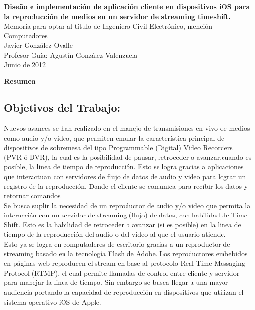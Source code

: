 \newpage
\thispagestyle{empty}
\begin{center}
 \Large \textbf{Diseño e implementación de aplicación cliente en dispositivos iOS para la reproducción de medios en un servidor de streaming timeshift.}\\

\normalsize Memoria para optar al título de Ingeniero Civil Electrónico, mención Computadores \\
\normalsize Javier González Ovalle \\
\normalsize Profesor Guía: Agustín González Valenzuela \\
\normalsize Junio de 2012

\Large \textbf{Resumen}

\end{center}
\normalsize
\subsection*{Objetivos del Trabajo:}
\normalsize

Nuevos avances se han realizado en el manejo de transmisiones en vivo de medios como audio y/o video, que permiten emular la característica principal de dispositivos de sobremesa del tipo Programmable (Digital) Video Recorders (PVR ó DVR), la cual es la posibilidad de pausar, retroceder o avanzar,cuando es posible, la linea de tiempo de reproducción. Esto se logra gracias a aplicaciones que interactuan con servidores de flujo de datos de audio y video para lograr un registro de la reproducción. Donde el cliente se comunica para recibir los datos y retornar comandos\\ 

Se busca suplir la necesidad de un reproductor de audio y/o video que permita la interacci\'on con un servidor de streaming (flujo) de datos, con habilidad de Time-Shift. Esto es la habilidad de retroceder o avanzar (si es posible) en la linea de tiempo de la reproducci\'on del audio o del video al que el usuario atiende.\\

Esto ya se logra en computadores de escritorio gracias a un reproductor de streaming basado en la tecnolog\'ia Flash de Adobe. Los reproductores embebidos en p\'aginas web reproducen el stream en base al protocolo Real Time Messaging Protocol (RTMP), el cual permite llamadas de control entre cliente y servidor para manejar la linea de tiempo. Sin embargo se busca llegar a una mayor audiencia portando la capacidad de reproducci\'on en dispositivos que utilizan el sistema operativo iOS de Apple.\\

